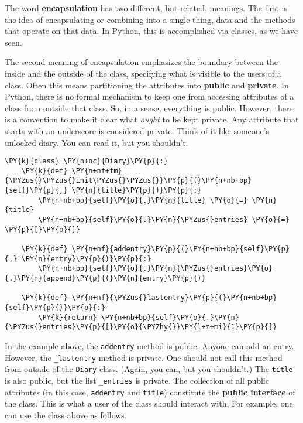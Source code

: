 The word \textbf{encapsulation} has two different, but related, meanings.  The first is the idea of encapsulating or combining into a single thing, data and the methods that operate on that data.  In Python, this is accomplished via classes, as we have seen.  


The second meaning of encapsulation emphasizes the boundary between the inside and the outside of the class, specifying what is visible to the users of a class.  Often this means partitioning the attributes into \textbf{public} and \textbf{private}.  In Python, there is no formal mechanism to keep one from accessing attributes of a class from outside that class.  So, in a sense, everything is public.  However, there is a convention to make it clear what \emph{ought} to be kept private.  Any attribute that starts with an underscore is considered private.  Think of it like someone’s unlocked diary.  You can read it, but you shouldn’t.

\begin{Verbatim}[commandchars=\\\{\}]
\PY{k}{class} \PY{n+nc}{Diary}\PY{p}{:}
    \PY{k}{def} \PY{n+nf+fm}{\PYZus{}\PYZus{}init\PYZus{}\PYZus{}}\PY{p}{(}\PY{n+nb+bp}{self}\PY{p}{,} \PY{n}{title}\PY{p}{)}\PY{p}{:}
        \PY{n+nb+bp}{self}\PY{o}{.}\PY{n}{title} \PY{o}{=} \PY{n}{title}
        \PY{n+nb+bp}{self}\PY{o}{.}\PY{n}{\PYZus{}entries} \PY{o}{=} \PY{p}{[}\PY{p}{]}

    \PY{k}{def} \PY{n+nf}{addentry}\PY{p}{(}\PY{n+nb+bp}{self}\PY{p}{,} \PY{n}{entry}\PY{p}{)}\PY{p}{:}
        \PY{n+nb+bp}{self}\PY{o}{.}\PY{n}{\PYZus{}entries}\PY{o}{.}\PY{n}{append}\PY{p}{(}\PY{n}{entry}\PY{p}{)}

    \PY{k}{def} \PY{n+nf}{\PYZus{}lastentry}\PY{p}{(}\PY{n+nb+bp}{self}\PY{p}{)}\PY{p}{:}
        \PY{k}{return} \PY{n+nb+bp}{self}\PY{o}{.}\PY{n}{\PYZus{}entries}\PY{p}{[}\PY{o}{\PYZhy{}}\PY{l+m+mi}{1}\PY{p}{]}
\end{Verbatim}



In the example above, the \texttt{addentry} method is public.  Anyone can add an entry.  However, the \texttt{\_lastentry} method is private.  One should not call this method from outside of the \texttt{Diary} class. (Again, you can, but you shouldn’t.)  The \texttt{title} is also public, but the list \texttt{\_entries} is private.  The collection of all public attributes (in this case, \texttt{addentry} and \texttt{title}) constitute the \textbf{public interface} of the class.  This is what a user of the class should interact with.  For example, one can use the class above as follows.

